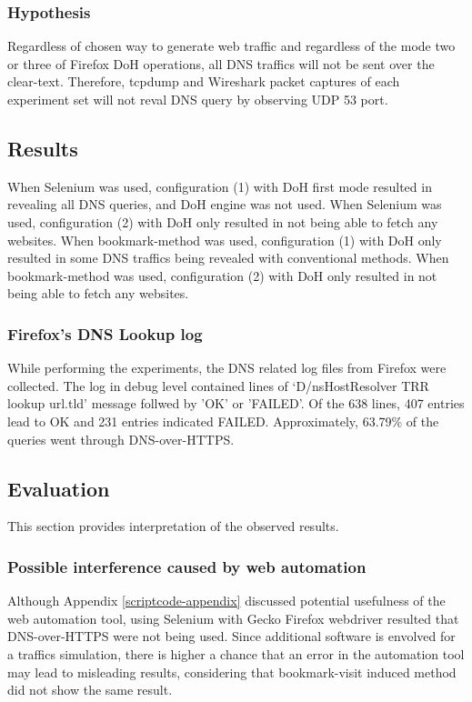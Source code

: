 \subsubsection{Hypothesis}
Regardless of chosen way to generate web traffic and regardless of the mode two or three of Firefox DoH operations, all DNS traffics will not be sent over the clear-text. Therefore, tcpdump and Wireshark packet captures of each experiment set will not reval DNS query by observing UDP 53 port.

\subsection{Results}
When Selenium was used, configuration (1) with DoH first mode resulted in revealing all DNS queries, and DoH engine was not used.
When Selenium was used, configuration (2) with DoH only resulted in not being able to fetch any websites.
When bookmark-method was used, configuration (1) with DoH only resulted in some DNS traffics being revealed with conventional methods.
When bookmark-method was used, configuration (2) with DoH only resulted in not being able to fetch any websites.

\subsubsection{Firefox's DNS Lookup log}
While performing the experiments, the DNS related log files from Firefox were collected.
The log in debug level contained lines of `D/nsHostResolver TRR lookup url.tld' message follwed by 'OK' or 'FAILED'.
Of the 638 lines, 407 entries lead to OK and 231 entries indicated FAILED. Approximately, 63.79\% of the queries went through DNS-over-HTTPS.

\subsection{Evaluation}
This section provides interpretation of the observed results.

\subsubsection{Possible interference caused by web automation}
Although Appendix \ref{scriptcode-appendix} discussed potential usefulness of the web automation tool, using Selenium with Gecko Firefox webdriver resulted that DNS-over-HTTPS were not being used.
Since additional software is envolved for a traffics simulation, there is higher a chance that an error in the automation tool may lead to misleading results, considering that bookmark-visit induced method did not show the same result.

